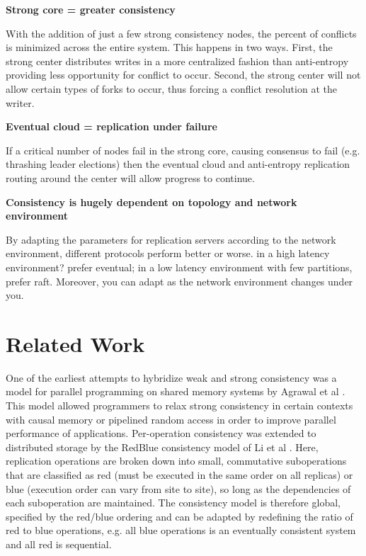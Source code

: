 \documentclass[letterpaper,twocolumn,10pt]{article}
\begin{document}
\textbf{Strong core = greater consistency}

With the addition of just a few strong consistency nodes, the percent of conflicts is minimized across the entire system. This happens in two ways. First, the strong center distributes writes in a more centralized fashion than anti-entropy providing less opportunity for conflict to occur. Second, the strong center will not allow certain types of forks to occur, thus forcing a conflict resolution at the writer.

\textbf{Eventual cloud = replication under failure}

If a critical number of nodes fail in the strong core, causing consensus to fail (e.g. thrashing leader elections) then the eventual cloud and anti-entropy replication routing around the center will allow progress to continue.

\textbf{Consistency is hugely dependent on topology and network environment}

By adapting the parameters for replication servers according to the network environment, different protocols perform better or worse. in a high latency environment? prefer eventual; in a low latency environment with few partitions, prefer raft. Moreover, you can adapt as the network environment changes under you.

\section{Related Work}

One of the earliest attempts to hybridize weak and strong consistency was a model for parallel programming on shared memory systems by Agrawal et al \cite{agrawal_mixed_1994}. This model allowed programmers to relax strong consistency in certain contexts with causal memory or pipelined random access in order to improve parallel performance of applications. Per-operation consistency was extended to distributed storage by the RedBlue consistency model of Li et al \cite{li_making_2012}. Here, replication operations are broken down into small, commutative suboperations that are classified as red (must be executed in the same order on all replicas) or blue (execution order can vary from site to site), so long as the dependencies of each suboperation are maintained. The consistency model is therefore global, specified by the red/blue ordering and can be adapted by redefining the ratio of red to blue operations, e.g. all blue operations is an eventually consistent system and all red is sequential.
\end{document}
